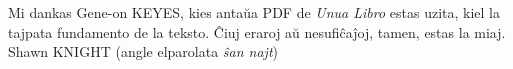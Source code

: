 \documentclass[12pt,twoside]{book}
\begin{document}
Mi dankas Gene-on KEYES, kies antaŭa PDF de \emph{Unua Libro} estas uzita, kiel la tajpata fundamento de la teksto.  Ĉiuj eraroj aŭ nesufiĉaĵoj, tamen, estas la miaj.\\[1ex]

{\setlength{\parindent}{0em}
Shawn KNIGHT (angle elparolata \emph{ŝan najt})\\
\hodiau}


\end{document}
